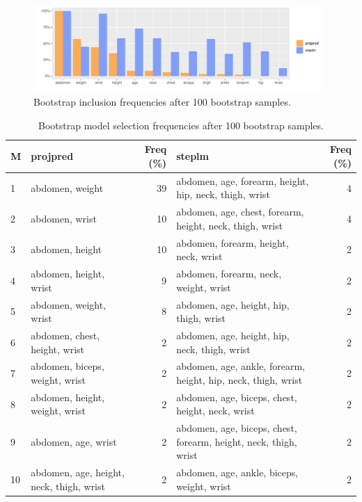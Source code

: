 \documentclass[american,]{article}
\theoremstyle{definition}
\begin{document}
\begin{figure}[tp]
  \centering
  \includegraphics[width=0.98\textwidth]{graphics/inc_prob.pdf}
  \caption{Bootstrap inclusion frequencies after 100 bootstrap samples.}
  \label{fig:inclusion_frequencies}
\end{figure}


\begin{table}[tp]
\scriptsize
\centering
\begin{tabular}{l||l|r||l|r}
  \hline
M & projpred & Freq (\%) & steplm & Freq (\%)  \\ 
  \hline
1 & abdomen, weight & 39 & abdomen, age, forearm, height, hip, neck, thigh, wrist & 4 \\
2 & abdomen, wrist & 10 & abdomen, age, chest, forearm, height, neck, thigh, wrist & 4 \\
3 & abdomen, height & 10 & abdomen, forearm, height, neck, wrist & 2 \\
4 & abdomen, height, wrist & 9 & abdomen, forearm, neck, weight, wrist & 2 \\
5 & abdomen, weight, wrist & 8 & abdomen, age, height, hip, thigh, wrist & 2 \\
6 & abdomen, chest, height, wrist & 2 & abdomen, age, height, hip, neck, thigh, wrist & 2 \\
7 & abdomen, biceps, weight, wrist & 2 & abdomen, age, ankle, forearm, height, hip, neck, thigh, wrist & 2 \\
8 & abdomen, height, weight, wrist & 2 & abdomen, age, biceps, chest, height, neck, wrist & 2 \\
9 & abdomen, age, wrist & 2 & abdomen, age, biceps, chest, forearm, height, neck, thigh, wrist & 2 \\
10 & abdomen, age, height, neck, thigh, wrist & 2 & abdomen, age, ankle, biceps, weight, wrist & 2 \\
   \hline
\end{tabular}
\caption{Bootstrap model selection frequencies after 100 bootstrap samples.}
\label{tab:model_frequencies}
\end{table}
\end{document}
